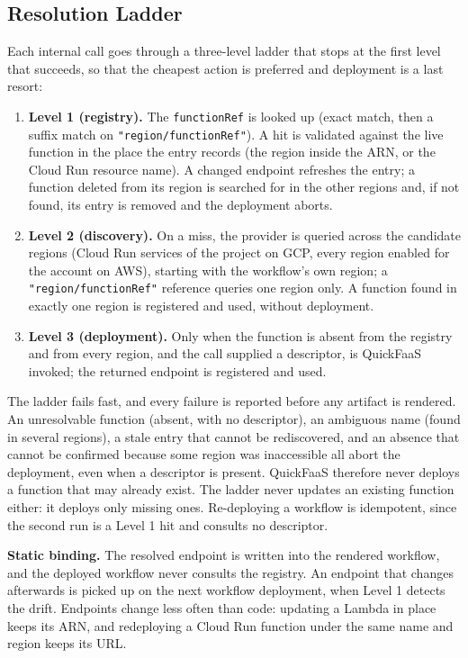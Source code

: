 \documentclass[conference]{IEEEtran}
\begin{document}
\subsection{Resolution Ladder}
Each internal call goes through a three-level ladder that stops at the first level that succeeds,
so that the cheapest action is preferred and deployment is a last resort:
\begin{enumerate}
  \item \textbf{Level 1 (registry).} The \texttt{functionRef} is looked up (exact match, then a
  suffix match on \texttt{"region/functionRef"}). A hit is validated against the live function in
  the place the entry records (the region inside the ARN, or the Cloud Run resource name). A
  changed endpoint refreshes the entry; a function deleted from its region is searched for in the
  other regions and, if not found, its entry is removed and the deployment aborts.
  \item \textbf{Level 2 (discovery).} On a miss, the provider is queried across the candidate
  regions (Cloud Run services of the project on GCP, every region enabled for the account on AWS),
  starting with the workflow's own region; a \texttt{"region/functionRef"} reference queries one
  region only. A function found in exactly one region is registered and used, without deployment.
  \item \textbf{Level 3 (deployment).} Only when the function is absent from the registry and from
  every region, and the call supplied a descriptor, is QuickFaaS invoked; the returned endpoint is
  registered and used.
\end{enumerate}

The ladder fails fast, and every failure is reported before any artifact is rendered. An
unresolvable function (absent, with no descriptor), an ambiguous name (found in several regions),
a stale entry that cannot be rediscovered, and an absence that cannot be confirmed because some
region was inaccessible all abort the deployment, even when a descriptor is present. QuickFaaS
therefore never deploys a function that may already exist. The ladder never updates an existing
function either: it deploys only missing ones. Re-deploying a workflow is idempotent, since the
second run is a Level 1 hit and consults no descriptor.

\textbf{Static binding.} The resolved endpoint is written into the rendered workflow, and the
deployed workflow never consults the registry. An endpoint that changes afterwards is picked up on
the next workflow deployment, when Level 1 detects the drift. Endpoints change less often than
code: updating a Lambda in place keeps its ARN, and redeploying a Cloud Run function under the same
name and region keeps its URL.
\end{document}
